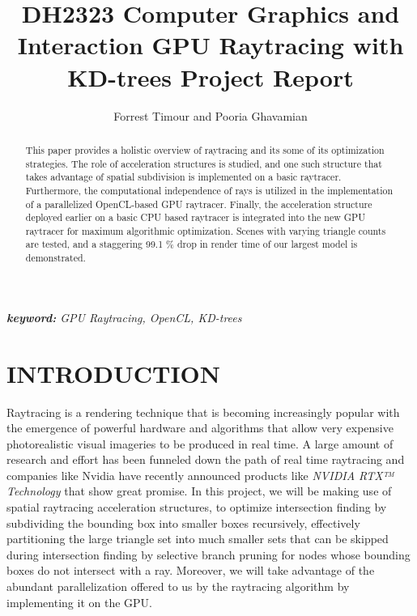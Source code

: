 \documentclass[letterpaper, 10 pt, conference]{ieeeconf}  %
\title{\LARGE \bf
DH2323 Computer Graphics and Interaction 
\linebreak GPU Raytracing with KD-trees
\linebreak Project Report
}
\author{Forrest Timour and Pooria Ghavamian} %
\begin{document}
\maketitle
\thispagestyle{empty}
\pagestyle{empty}


\begin{abstract}


This paper provides a holistic overview of raytracing and its some of its optimization strategies. The role of acceleration structures is studied, and one such structure that takes advantage of spatial subdivision is implemented on a basic raytracer. Furthermore, the computational independence of rays is utilized in the implementation of a parallelized OpenCL-based GPU raytracer. Finally, the acceleration structure deployed earlier on a basic CPU based raytracer is integrated into the new GPU raytracer for maximum algorithmic optimization. Scenes with varying triangle counts are tested, and a staggering 99.1 \% drop in render time of our largest model is demonstrated. 


\end{abstract}

\textit{\textbf{keyword:} GPU Raytracing, OpenCL, KD-trees } 

\section{INTRODUCTION}

Raytracing is a rendering technique that is becoming increasingly popular with the emergence of powerful hardware and algorithms that allow very expensive photorealistic visual imageries to be produced in real time. A large amount of research and effort has been funneled down the path of real time raytracing and companies like Nvidia have recently announced products like \textit{NVIDIA RTX™ Technology} that show great promise. In this project, we will be making use of spatial raytracing acceleration structures, to optimize intersection finding by subdividing the bounding box into smaller boxes recursively, effectively partitioning the large triangle set into much smaller sets that can be skipped during intersection finding by selective branch pruning for nodes whose bounding boxes do not intersect with a ray. Moreover, we will take advantage of the abundant parallelization offered to us by the raytracing algorithm by implementing it on the GPU.
\end{document}
